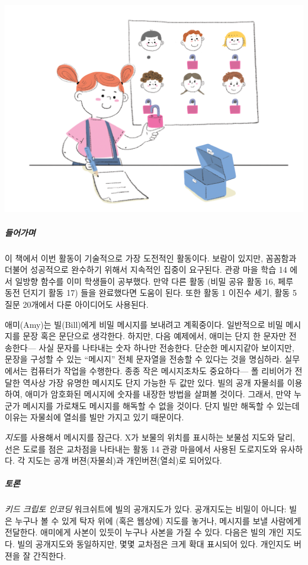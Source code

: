 \documentclass[]{article}
\begin{document}
\includegraphics{csunplugged/05-part/img/ch19-public-key/18-public-key-01-kid-crypto.png}

\subparagraph{들어가며}\label{section-251}

이 책에서 이번 활동이 기술적으로 가장 도전적인 활동이다. 보람이 있지만,
꼼꼼함과 더불어 성공적으로 완수하기 위해서 지속적인 집중이 요구된다.
관광 마을 학습 14 에서 일방향 함수를 이미 학생들이 공부했다. 만약 다른
활동 (비밀 공유 활동 16, 페루 동전 던지기 활동 17) 들을 완료했다면
도움이 된다. 또한 활동 1 이진수 세기, 활동 5 질문 20개에서 다룬
아이디어도 사용된다.

애미(Amy)는 빌(Bill)에게 비밀 메시지를 보내려고 계획중이다. 일반적으로
비밀 메시지를 문장 혹은 문단으로 생각한다. 하지만, 다음 예제에서, 애미는
단지 한 문자만 전송한다--- 사실 문자를 나타내는 숫자 하나만 전송한다.
단순한 메시지같아 보이지만, 문장을 구성할 수 있는 ``메시지'' 전체
문자열을 전송할 수 있다는 것을 명심하라. 실무에서는 컴퓨터가 작업을
수행한다. 종종 작은 메시지조차도 중요하다--- 폴 리비어가 전달한 역사상
가장 유명한 메시지도 단지 가능한 두 값만 있다. 빌의 공개 자물쇠를
이용하여, 애미가 암호화된 메시지에 숫자를 내장한 방법을 살펴볼 것이다.
그래서, 만약 누군가 메시지를 가로채도 메시지를 해독할 수 없을 것이다.
단지 빌만 해독할 수 있는데 이유는 자물쇠에 열쇠를 빌만 가지고 있기
때문이다.

\emph{지도}를 사용해서 메시지를 잠근다. X가 보물의 위치를 표시하는
보물섬 지도와 달리, 선은 도로를 점은 교차점을 나타내는 활동 14 관광
마을에서 사용된 도로지도와 유사하다. 각 지도는 공개 버젼(자물쇠)과
개인버젼(열쇠)로 되어있다.

\subparagraph{토론}\label{section-252}

\emph{키드 크립토 인코딩} 워크쉬트에 빌의 공개지도가 있다. 공개지도는
비밀이 아니다: 빌은 누구나 볼 수 있게 탁자 위에 (혹은 웹상에) 지도를
놓거나, 메시지를 보낼 사람에게 전달한다. 애미에게 사본이 있듯이 누구나
사본을 가질 수 있다. 다음은 빌의 개인 지도다. 빌의 공개지도와
동일하지만, 몇몇 교차점은 크게 확대 표시되어 있다. 개인지도 버젼을 잘
간직한다.
\end{document}
